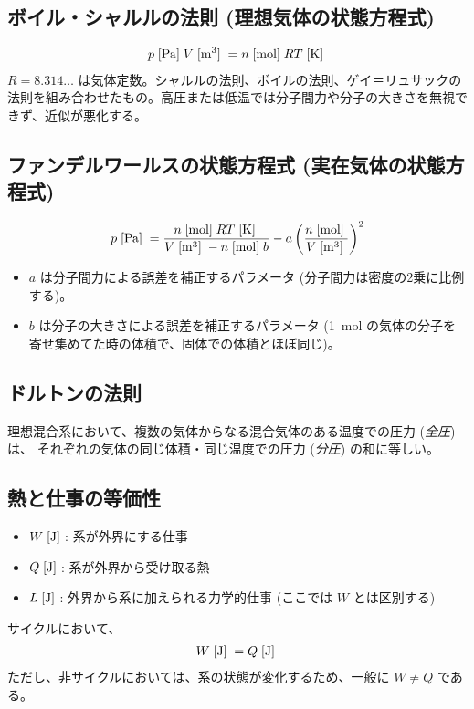 \documentclass[a4paper,11pt]{jsarticle}
\newcommand{\braunit}[1]{\;\text{[}\unit[per-mode = symbol]{#1}\text{]}\;}
\begin{document}
\subsection*{ボイル・シャルルの法則 (理想気体の状態方程式)}
\begin{align*}
  p\braunit{\Pa}V\braunit{\m^3} = n\braunit{\mol}RT\braunit{\K}
\end{align*}
$R=8.314\dots$ は気体定数。シャルルの法則、ボイルの法則、ゲイ＝リュサックの法則を組み合わせたもの。高圧または低温では分子間力や分子の大きさを無視できず、近似が悪化する。
\cite[pp.15]{thermo}

\subsection*{ファンデルワールスの状態方程式 (実在気体の状態方程式)}
\begin{align*}
  p\braunit{\Pa} = \frac{n\braunit{\mol}RT\braunit{\K}}{V\braunit{\m^3} - n\braunit{\mol}b} - a\left(\frac{n\braunit{\mol}}{V\braunit{\m^3}}\right)^2
\end{align*}
\begin{itemize}
  \item $a$ は分子間力による誤差を補正するパラメータ (分子間力は密度の2乗に比例する)。
  \item $b$ は分子の大きさによる誤差を補正するパラメータ (\qty{1}{\mol} の気体の分子を寄せ集めてた時の体積で、固体での体積とほぼ同じ)。
\end{itemize}
\cite[pp.17]{thermo}

\subsection*{ドルトンの法則}
理想混合系において、複数の気体からなる混合気体のある温度での圧力 (\emph{全圧}) は、
それぞれの気体の同じ体積・同じ温度での圧力 (\emph{分圧}) の和に等しい。
\cite[pp.18]{thermo}

\subsection*{熱と仕事の等価性}
\begin{itemize}
  \item $W\braunit{\J}$: 系が外界にする仕事
  \item $Q\braunit{\J}$: 系が外界から受け取る熱
  \item $L\braunit{\J}$: 外界から系に加えられる力学的仕事 (ここでは $W$ とは区別する)
\end{itemize}
サイクルにおいて、
\begin{align*}
  W\braunit{\J} = Q\braunit{\J}
\end{align*}
ただし、非サイクルにおいては、系の状態が変化するため、一般に $W \neq Q$ である。
\cite[pp.34]{thermo}
\end{document}
